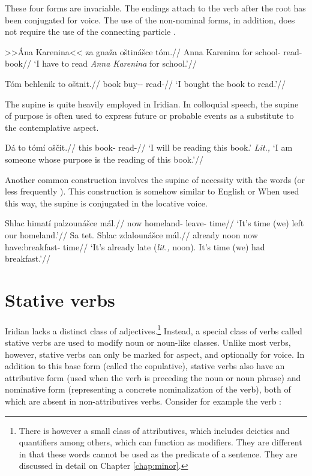 These four forms are invariable. The endings attach to the verb after the root has been conjugated for voice. The use of the non-nominal forms, in addition, does not require the use of the connecting particle .

\pex
\a\begingl
\gla >>Ána Karenina<< za gnaža oštinášce tóm.//
\glb Anna Karenina for school-\Pat{} read- book//
\glft `I have to read \textit{Anna Karenina} for school.'//
\endgl

\a\begingl
\gla Tóm behlenik to oštnit.//
\glb book buy-\Pv{}-\Pf{}  read-//
\glft `I bought the book to read.'//
\endgl
\xe

The supine is quite heavily employed in Iridian. In colloquial speech, the supine of purpose is often used to express future or probable events as a substitute to the contemplative aspect.

\pex
\begingl
\gla Dá to t\'om\'i oščit.//
\glb \First{}\Sg{} this book-\Gen{} read-//
\glft `I will be reading this book.' \emph{Lit.,} `I am someone whose purpose is the reading of this book.'//
\endgl
\xe

Another common construction involves the supine of necessity with the words   (or less frequently ). This construction is somehow similar to English  or  When used this way, the supine is conjugated in the locative voice.

\pex
\begingl
\gla Shlac himatí palzounášce mál.//
\glb now homeland-\Gen{} leave- time//
\glft `It's time (we) left our homeland.'//
\endgl
\xe
\pex
\begingl
\gla Sa tet. Shlac zdalounášce mál.//
\glb already noon now have:breakfast- time//
\glft `It's already late (\emph{lit.,} noon). It's time (we) had breakfast.'//
\endgl
\xe

\section{Stative verbs}\label{sec:statives}

Iridian lacks a distinct class of adjectives.\footnote{There is however a small class of attributives, which includes deictics and quantifiers among others, which can function as modifiers. They are different in that these words cannot be used as the predicate of a sentence. They are discussed in detail on Chapter \ref{chap:minor}.} Instead, a special class of verbs called {\sc stative verbs} are used to modify noun or noun-like classes. Unlike most verbs, however, stative verbs can only be marked for aspect, and optionally for voice. In addition to this base form (called the {\sc copulative}), stative verbs also have an {\sc attributive} form (used when the verb is preceding the noun or noun phrase) and {\sc nominative} form (representing a concrete nominalization of the verb), both of which are absent in non-attributives verbs. Consider for example the verb  :

